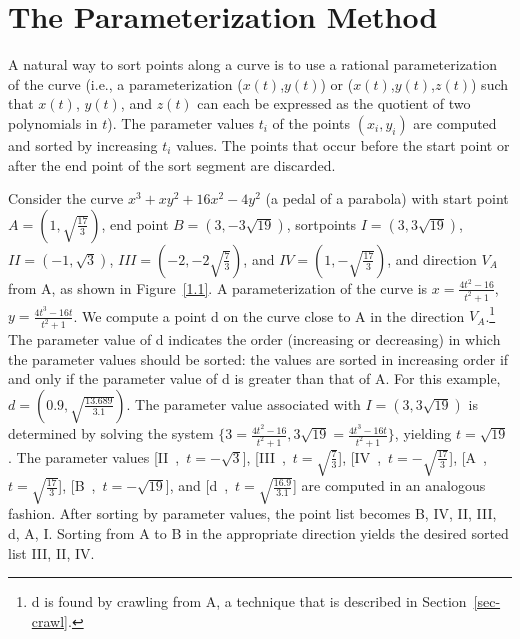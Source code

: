 %
%
\section{The Parameterization Method}
\label{sec-param}

A natural way to sort points along a curve is to use a rational
parameterization of the curve (i.e., a parameterization \mbox{($x(t)$,$y(t)$)}
or \mbox{($x(t)$,$y(t)$,$z(t)$)}
such that $x(t)$, $y(t)$, and $z(t)$ 
can each be expressed as the quotient of two polynomials in $t$).
The parameter values $t_{i}$ of the points $(x_{i},y_{i})$ are computed and sorted by increasing $t_{i}$ values. 
The points 
that occur before the start point or after the end point of the sort segment
are discarded.
%
\begin{example}
\label{pedalPRAM}
Consider the curve \( x^{3} + xy^{2} + 16x^{2} - 4y^{2} \) (a pedal of 
a parabola) with start point \( A = (1,\sqrt{\frac{17}{3}}) \),
end point \( B = (3,-3\sqrt{19}) \), sortpoints 
\( I = (3,3\sqrt{19}) \), 
\( II = (-1,\sqrt{3}) \),
\( III = (-2,-2\sqrt{\frac{7}{3}}) \), and
\( IV = (1,-\sqrt{\frac{17}{3}}) \),
and direction $V_{A}$ from A, as shown in Figure~\ref{1.1}.
A parameterization of the curve is
\( x = \frac{4t^{2} - 16}{t^{2}+1} \),
\( y = \frac{4t^{3} - 16t}{t^{2}+1} \).
We compute a point d on the curve close to A in the direction 
$V_{A}$.\footnote{d is found by crawling 
from A, a technique that is described in Section~\ref{sec-crawl}.}
The parameter value of d indicates the order (increasing or decreasing)
in which the parameter values should be sorted: the values are sorted
in increasing order if and only if the parameter value of d is greater 
than that of A.
For this example, \( d = (0.9,\sqrt{\frac{13.689}{3.1}}) \).
The parameter value associated with 
\mbox{\( I = (3,3\sqrt{19}) \)} is determined by solving the system
\mbox{\( \{ 3 = \frac{4t^{2} - 16}{t^{2}+1}, 
3\sqrt{19} = \frac{4t^{3} - 16t}{t^{2}+1} \} \),}
yielding \mbox{\( t = \sqrt{19} \)}.
The parameter values
\mbox{[II\ ,\ $t = -\sqrt{3}$],}
\mbox{[III\ ,\ $t = \sqrt{\frac{7}{3}}$],}
\mbox{[IV\ ,\ $t = -\sqrt{\frac{17}{3}}$],}
\mbox{[A\ ,\ $t = \sqrt{\frac{17}{3}}$],}
\mbox{[B\ ,\ $t = -\sqrt{19}$],} and
\mbox{[d\ ,\ $t = \sqrt{\frac{16.9}{3.1}}$]}
are computed in an analogous fashion.
After sorting by parameter values, the point list becomes 
B, IV, II, III, d, A, I.
Sorting from A to B in the appropriate direction yields the
desired sorted list III, II, IV.
\end{example}
%

